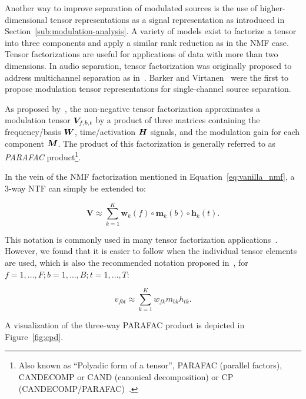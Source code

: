 
Another way to improve separation of modulated sources is the use of higher-dimensional tensor representations as a signal representation as introduced in Section~\ref{sub:modulation-analysis}.
A variety of models exist to factorize a tensor into three components and apply a similar rank reduction as in the \acs{NMF} case.
Tensor factorizations are useful for applications of data with more than two dimensions.
In audio separation, tensor factorization was originally proposed to address multichannel separation as in~\cite{fitzgerald08, fevotte10, ozerov11}. 
Barker and Virtanen~\cite{barker13} were the first to propose modulation tensor representations for single-channel source separation. 
\par
As proposed by~\cite{barker13}, the non-negative tensor factorization approximates a modulation tensor \({\bm{V}}_{f, b, t}\) by a product of three matrices containing the frequency/basis \({\bm{W}}\), time/activation \({\bm{H}}\) signals, and the modulation gain for each component \({\bm{M}}\).
The product of this factorization is generally referred to as \emph{PARAFAC} product\footnote{Also known as ``Polyadic form of a tensor'', PARAFAC (parallel factors), CANDECOMP or CAND (canonical decomposition) or CP (CANDECOMP/PARAFAC)~\cite{kolda09}.}.

In the vein of the \acs{NMF} factorization mentioned in Equation~\ref{eq:vanilla_nmf}, a 3-way \ac{NTF} can simply be extended to:

\begin{equation}
   \mathbf{V} \approx \sum\limits_{k=1}^{K} \mathbf{w}_{k}(f) \circ \mathbf{m}_{k}(b) \circ \mathbf{h}_{k}(t).
\end{equation}

This notation is commonly used in many tensor factorization applications~\cite{kolda09}.
However, we found that it is easier to follow when the individual tensor elements are used, which is also the recommended notation proposed in~\cite{kiers00}, for $f = 1,\ldots,F; b=1,\ldots,B;t=1,\ldots,T$:

\begin{equation}
  v_{fbt} \approx \sum_{k = 1}^{K} w_{fk} m_{bk} h_{tk}.
\end{equation}

A visualization of the three-way PARAFAC product is depicted in Figure~\ref{fig:cpd}.


